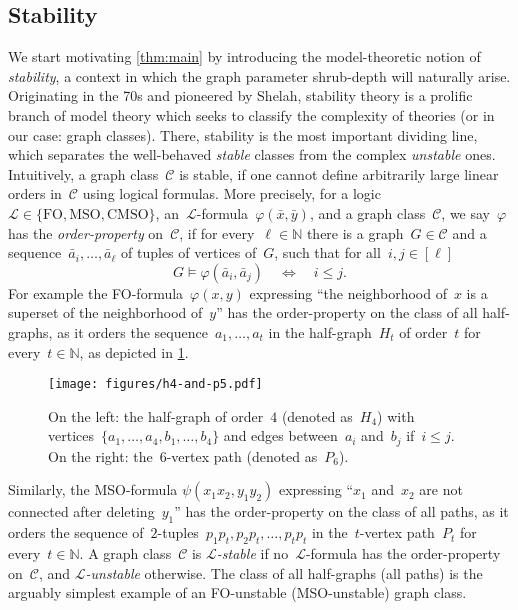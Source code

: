 \documentclass[11pt]{article}      \usepackage[margin=1in]{geometry}  \usepackage{microtype}
\theoremstyle{definition}
\newcommand{\N}[0]{\mathrm{\mathbb{N}}}
\renewcommand{\phi}{\varphi}
\newcommand{\LL}{\mathcal{L}}
\newcommand{\FO}{\mathrm{FO}}
\newcommand{\MSO}{\mathrm{MSO}}
\newcommand{\CMSO}{\mathrm{CMSO}}
\newcommand{\CC}{\mathcal{C}}
\renewcommand{\le}{\leqslant}
\renewcommand{\leq}{\le}
\begin{document}
\subsection*{Stability}
We start motivating \cref{thm:main} by introducing the model-theoretic notion of \emph{stability}, a context in which the graph parameter shrub-depth will naturally arise.
Originating in the 70s and pioneered by Shelah, stability theory is a prolific branch of model theory which seeks to classify the complexity of theories (or in our case: graph classes).
There, stability is the most important dividing line, which separates the well-behaved \emph{stable} classes from the complex \emph{unstable} ones.
Intuitively, a graph class~$\CC$ is stable, if one cannot define arbitrarily large linear orders in~$\CC$ using logical formulas.
More precisely,
for a logic~$\LL\in\{\FO,\MSO, \CMSO\}$, an~$\LL$-formula~$\phi(\bar x,\bar y)$, and a graph class~$\CC$,
we say~$\phi$ has the \emph{order-property} on~$\CC$, if for every~$\ell \in \N$ there is a graph~$G\in\CC$ and a sequence~$\bar{a}_i, \ldots, \bar a_\ell$ 
of tuples of vertices of~$G$, such that
for all~$i,j\in[\ell]$
  \[G \models \phi(\bar{a}_i,\bar{a}_j) \quad \Leftrightarrow \quad  i \leq j.\]
For example the FO-formula~$\phi(x,y)$ expressing ``the neighborhood of~$x$ is a superset of the neighborhood of~$y$''
has the order-property on the class of all half-graphs, as it orders the sequence~$a_1,\ldots,a_t$ in the half-graph~$H_t$ of order~$t$ for every~$t\in\N$, as depicted in \cref{fig:h4-and-p5}.

\begin{figure}[htbp]
  \centering
  \texttt{[image: figures/h4-and-p5.pdf]}
  \caption{On the left: the half-graph of order~$4$ (denoted as~$H_4$) with vertices~$\{a_1,\ldots,a_4,b_1,\ldots,b_4\}$ and edges between~$a_i$ and~$b_j$ if~$i\leq j$.
  On the right: the~$6$-vertex path (denoted as~$P_6$).}
  \label{fig:h4-and-p5}
\end{figure}

Similarly, the MSO-formula
$\psi(x_1x_2,y_1y_2)$ expressing ``$x_1$ and~$x_2$ are not connected after deleting~$y_1$''
has the order-property on the class of all paths, as it orders the sequence of~$2$-tuples~$p_1p_t,p_2p_t,\ldots,p_tp_t$ in the~$t$-vertex path~$P_t$ for every~$t\in\N$.
A graph class~$\CC$ is \emph{$\LL$-stable} if no~$\LL$-formula has the order-property on~$\CC$, and \emph{$\LL$-unstable} otherwise.
The class of all half-graphs (all paths) is the arguably simplest example of an FO-unstable (MSO-unstable) graph class.
\end{document}
